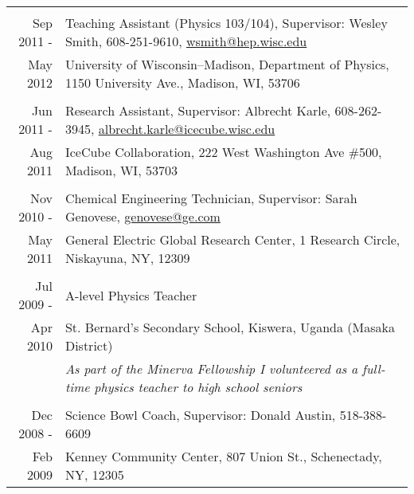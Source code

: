 \documentclass[10pt]{article} %
\begin{document}
\begin{tabulary}{\textwidth}{RL}
\vspace{5pt} \\

Sep 2011 -     & Teaching Assistant (Physics 103/104), Supervisor: Wesley Smith, 608-251-9610, \href{mailto:wsmith@hep.wisc.edu}{wsmith@hep.wisc.edu} \\
 May 2012      & University of Wisconsin--Madison, Department of Physics, 1150 University Ave., Madison, WI, 53706 \\ %

\vspace{5pt} \\

Jun 2011 -     & Research Assistant, Supervisor: Albrecht Karle, 608-262-3945, \href{mailto:albrecht.karle@icecube.wisc.edu}{albrecht.karle@icecube.wisc.edu} \\
 Aug 2011      & IceCube Collaboration, 222 West Washington Ave \#500, Madison, WI, 53703 \\ %

\vspace{5pt} \\

Nov 2010 -     & Chemical Engineering Technician, Supervisor: Sarah Genovese, \href{mailto:genovese@ge.com}{genovese@ge.com} \\
 May 2011      & General Electric Global Research Center, 1 Research Circle, Niskayuna, NY, 12309 \\ %

\vspace{5pt} \\

Jul 2009 -     & A-level Physics Teacher \\
 Apr 2010      & St. Bernard's Secondary School, Kiswera, Uganda (Masaka District) \\
 {}            & \emph{As part of the Minerva Fellowship I volunteered as a full-time physics teacher to high school seniors} \\ %

\vspace{5pt} \\

Dec 2008 -     & Science Bowl Coach, Supervisor: Donald Austin, 518-388-6609 \\
 Feb 2009      & Kenney Community Center, 807 Union St., Schenectady, NY, 12305 \\ %


\end{tabulary}
\end{document}
